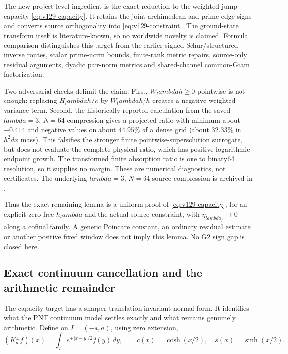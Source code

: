 \documentclass[11pt]{article}
\def\lambda{lambda}%
\theoremstyle{remark}
\begin{document}
The new project-level ingredient is the exact reduction to the
weighted jump capacity \eqref{eq:v129-capacity}. It retains the joint
archimedean and prime edge signs and converts source orthogonality into
\eqref{eq:v129-constraint}. The ground-state transform itself is
literature-known, so no worldwide novelty is claimed. Formula
comparison distinguishes this target from the earlier signed
Schur/structured-inverse routes, scalar prime-norm bounds, finite-rank
metric repairs, source-only residual arguments, dyadic pair-norm
metrics and shared-channel common-Gram factorization.

Two adversarial checks delimit the claim. First, $W_\lambda h\ge0$
pointwise is not enough: replacing $H_\lambda h/h$ by
$W_\lambda h/h$ creates a negative weighted variance term. Second,
the historically reported calculation from the saved $\lambda=3$, $N=64$
compression gives a projected ratio with
minimum about $-0.414$ and negative values on about $44.95\%$ of a
dense grid (about $32.33\%$ in $h^2dx$ mass). This falsifies the
stronger finite pointwise-supersolution surrogate, but does not
evaluate the complete physical ratio, which has positive logarithmic
endpoint growth. The transformed finite absorption ratio is one to
binary64 resolution, so it supplies no margin. These are numerical
diagnostics, not certificates. The underlying $\lambda=3$, $N=64$ source compression is archived in .

Thus the exact remaining lemma is a uniform proof of
\eqref{eq:v129-capacity}, for an explicit zero-free $h_\lambda$ and the
actual source constraint, with $\eta_{\lambda_j}\to0$ along a cofinal
family. A generic Poincare constant, an ordinary residual estimate or
another positive fixed window does not imply this lemma. No G2 sign
gap is closed here.

\subsection{Exact continuum cancellation and the arithmetic remainder}

The capacity target has a sharper translation-invariant normal form.
It identifies what the PNT continuum model settles exactly and what
remains genuinely arithmetic. Define on $I=(-a,a)$, using zero
extension,
\[
 (K_a^\pm f)(x)=\int_I e^{\pm|x-y|/2}f(y)\,dy,\qquad
 c(x)=\cosh(x/2),\quad s(x)=\sinh(x/2).
\]
\end{document}
